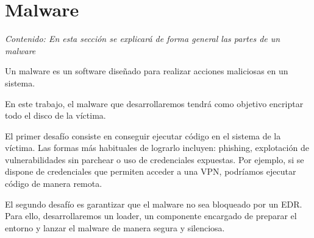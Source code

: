 \chapter{Malware}

\textit{Contenido: En esta sección se explicará de forma general las partes 
de un malware}
\vspace{1em}

Un malware es un software diseñado para realizar acciones maliciosas en un 
sistema.

En este trabajo, el malware que desarrollaremos tendrá como objetivo encriptar 
todo el disco de la víctima.

El primer desafío consiste en conseguir ejecutar código en el sistema de la 
víctima. Las formas más habituales de lograrlo incluyen: phishing, explotación 
de vulnerabilidades sin parchear o uso de credenciales expuestas. Por ejemplo, 
si se dispone de credenciales que permiten acceder a una VPN, podríamos ejecutar 
código de manera remota.

El segundo desafío es garantizar que el malware no sea bloqueado por un EDR. 
Para ello, desarrollaremos un loader, un componente encargado de preparar el 
entorno y lanzar el malware de manera segura y silenciosa.




